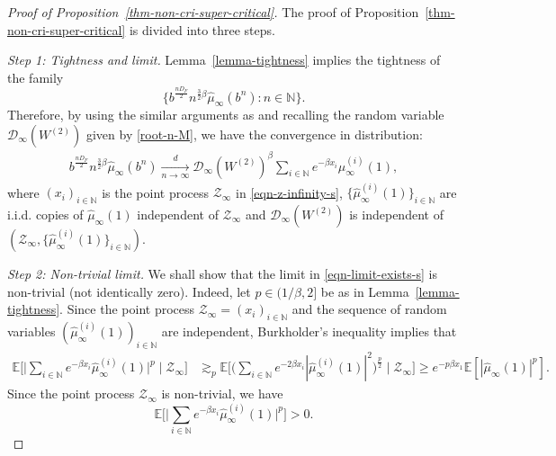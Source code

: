 \documentclass[12pt]{amsart}
\theoremstyle{definition}
\theoremstyle{remark}
\newcommand{\N}{\mathbb{N}}
\newcommand{\E}{\mathbb{E}}
\numberwithin{equation}{section}
\begin{document}
\begin{proof}[Proof of Proposition~\ref{thm-non-cri-super-critical}]
The proof of Proposition~\ref{thm-non-cri-super-critical} is divided into three steps.

{\flushleft \it Step 1: Tightness and limit.}
Lemma~\ref{lemma-tightness} implies  the tightness of the family 
\[
\Big\{ b^{\frac{n D_F}{2}}   n^{\frac{3}{2}\beta} \widehat{\mu}_{\infty}(b^{n})  : n\in \N\Big\}. 
\]
Therefore,  by using the similar arguments as \cite[Theorem 2.5]{Iksanov} and recalling the random variable $\mathscr{D}_\infty(W^{(2)})$ given by \eqref{root-n-M},  we have the convergence in distribution: 
\begin{align}\label{eqn-limit-exists-s}
   b^{\frac{n D_F}{2}}   n^{\frac{3}{2}\beta} \widehat{\mu}_{\infty}(b^{n})     \xrightarrow[n\to\infty]{d}       \mathscr{D}_\infty(W^{(2)})^\beta   \sum_{i\in \N} e^{-\beta x_i}\widehat{\mu}^{(i)}_\infty(1),
\end{align}
where $(x_i)_{i\in\N}$ is the  point process  $\mathcal{Z}_\infty$ in \eqref{eqn-z-infinity-s},  $\{\widehat{\mu}^{(i)}_\infty(1)\}_{i\in \N}$ are i.i.d. copies of $\widehat{\mu}_\infty(1)$  independent of $\mathcal{Z}_\infty$ and    $\mathscr{D}_\infty(W^{(2)})$ is independent of   $(\mathcal{Z}_\infty, \{\widehat{\mu}^{(i)}_\infty(1)\}_{i\in \N})$. 


{\flushleft \it Step 2: Non-trivial limit.} We shall show that the limit in \eqref{eqn-limit-exists-s} is non-trivial (not identically zero).  Indeed,  let  $p\in (1/\beta,2]$ be as in Lemma~\ref{lemma-tightness}. Since the point process $\mathcal{Z}_\infty=(x_i)_{i\in\N}$ and the sequence of random variables $(\widehat{\mu}_{\infty}^{(i)} (1) )_{i\in\N}$ are independent,  Burkholder's  inequality implies that 
\begin{align*}
\E\Big[\big|\sum_{i\in \N} e^{-\beta x_i}\widehat{\mu}_{\infty}^{(i)} (1) \big|^p\mid \mathcal{Z}_\infty \Big]& \gtrsim_p \E\Big[\big(\sum_{i\in \N} e^{-2\beta x_i}|\widehat{\mu}_{\infty}^{(i)} (1) |^2\big)^{\frac{p}{2}}\mid \mathcal{Z}_\infty \Big]\geq e^{-p\beta x_1}\E[|\widehat{\mu}_\infty(1)|^p].
\end{align*}
Since  the point process   $\mathcal{Z}_\infty$ is non-trivial, 
we have 
\[
\E\Big[\big|\sum_{i\in \N} e^{-\beta x_i}\widehat{\mu}_{\infty}^{(i)} (1) \big|^p\Big]>0.
\]


\end{proof}
\end{document}
